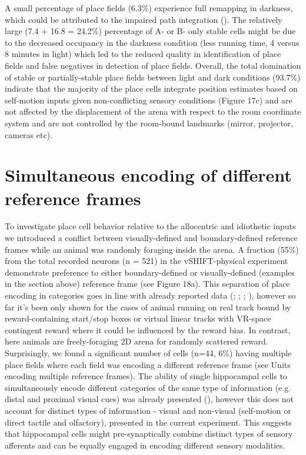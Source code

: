 A small percentage of place fields (6.3\%) experience full remapping in darkness, which could be attributed to the impaired path integration (\cite{Allen6245}). The relatively large (7.4 + 16.8 = 24.2\%) percentage of A- or B- only stable cells might be due to the decreased occupancy in the darkness condition (less running time, 4 versus 8 minutes in light) which led to the reduced quality in identification of place fields and false negatives in detection of place fields. Overall, the total domination of stable or partially-stable place fields between light and dark conditions (93.7\%) indicate that the majority of the place cells integrate position estimates based on self-motion inputs given non-conflicting sensory conditions (Figure 17c) and are not affected by the displacement of the arena with respect to the room coordinate system and are not controlled by the room-bound landmarks (mirror, projector, cameras etc).


\section{Simultaneous encoding of different reference frames}
\label{sec:integration_of_sm_imputs}

To investigate place cell behavior relative to the allocentric and idiothetic inputs we introduced a conflict between visually-defined and boundary-defined reference frames while an animal was randomly foraging inside the arena. A fraction (55\%) from the total recorded neurons (n = 521) in the vSHIFT-physical experiment demonstrate preference to either boundary-defined or visually-defined (examples in the section above) reference frame (see Figure 18a). This separation of place encoding in categories goes in line with already reported data (\cite{Mcnaughton1996}; \cite{Aronov2014}; \cite{Chen2013}; \cite{Haas2019}), however so far it’s been only shown for the cases of animal running on real track bound by reward-containing start/stop boxes or virtual linear tracks with VR-space contingent reward where it could be influenced by the reward bias. In contrast, here animals are freely-foraging  2D arena  for randomly scattered reward. Surprisingly, we found a significant number of cells (n=44, 6\%) having multiple place fields where each field was encoding a different reference frame (see Units encoding multiple reference frames). The ability of single hippocampal cells to simultaneously encode different categories of the same type of information (e.g. distal and proximal visual cues) was already presented (\cite{Knierim2002}), however this does not account for distinct types of information - visual and non-visual (self-motion or direct tactile and olfactory), presented in the current experiment. This suggests that hippocampal cells might pre-synaptically combine distinct types of sensory afferents and can be equally engaged in encoding different sensory modalities.

